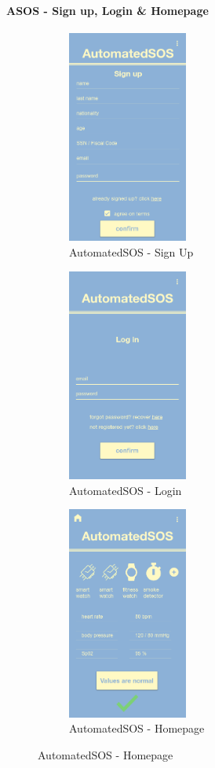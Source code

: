 \paragraph{ASOS - Sign up, Login \& Homepage}
\begin{figure}[H]
\centering
\begin{subfigure}{.33\textwidth}
  \centering
  \includegraphics[width=.9\linewidth, height = 7cm, keepaspectratio]{./Images/Mockups/AutomatedSOS/ASOS_SignUp.png}
  \caption{AutomatedSOS - Sign Up}
\end{subfigure}%
\begin{subfigure}{.33\textwidth}
  \centering
  \includegraphics[width = .9\linewidth, height = 7cm, keepaspectratio]{./Images/Mockups/AutomatedSOS/ASOS_Login.png}
  \caption{AutomatedSOS - Login}
\end{subfigure}
\begin{subfigure}{.33\textwidth}
  \centering
  \includegraphics[width = .9\linewidth, height = 7cm, keepaspectratio]{./Images/Mockups/AutomatedSOS/ASOS_Homepage.png}
  \caption{AutomatedSOS - Homepage}
\end{subfigure}
\end{figure}

